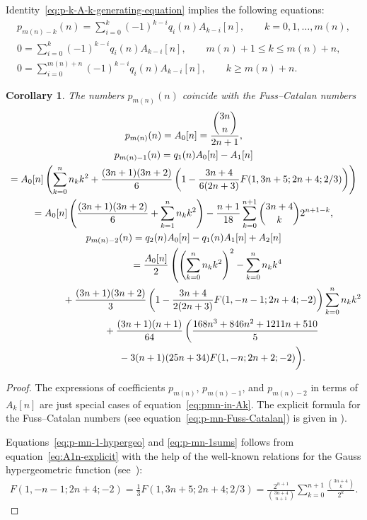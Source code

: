 \documentclass[pdftex]{sigma}
\numberwithin{equation}{section}
\newtheorem{Corollary}[Theorem]{Corollary}
\begin{document}
Identity~\eqref{eq:p-k-A-k-generating-equation} implies the following equations:
\begin{gather}
p_{m(n)-k}(n) =\sum\limits_{i=0}^k(-1)^{k-i}q_i(n)A_{k-i}[n],\qquad k=0,1,\ldots,m(n),\label{eq:pmn-in-Ak}\\
0 =\sum\limits_{i=0}^k(-1)^{k-i}q_i(n)A_{k-i}[n],\qquad m(n)+1\leq k\leq m(n)+n,\nonumber\\
0 =\sum\limits_{i=0}^{m(n)+n}(-1)^{k-i}q_i(n)A_{k-i}[n],\qquad k\geq m(n)+n.\nonumber
\end{gather}
\begin{Corollary}
The numbers $p_{m(n)}(n)$ coincide with the Fuss--Catalan numbers
\begin{gather}
 p_{m(n)}(n)=A_0[n]=\frac{\dbinom{3n}{n}}{2n+1},\label{eq:p-mn-Fuss-Catalan}\\
 p_{m(n)-1}(n)=q_1(n)A_0[n]-A_1[n]\label{eq:pmn-1-via-Ak}\\
 =A_0[n] \left(\sum\limits_{k=0}^n n_kk^2
+\frac{(3n+1)(3n+2)}{6} \left(1-\frac{3n+4}{6(2n+3)}F(1,3n+5;2n+4;2/3)\right) \right)\label{eq:p-mn-1-hypergeo}\\
 =A_0[n]\left(\frac{(3n+1)(3n+2)}{6}+\sum\limits_{k=1}^{n}n_kk^2\right)
-\frac{n+1}{18}\sum\limits_{k=0}^{n+1}\binom{3n+4}{k}2^{n+1-k},\label{eq:p-mn-1sums}
\\
\label{eq:pmn-2-via-Ak}
p_{m(n)-2}(n) =q_2(n)A_0[n]-q_1(n)A_1[n]+A_2[n]\\
\hphantom{p_{m(n)-2}(n)}{} =\frac{A_0[n]}{2}\left(\left(\sum\limits_{k=0}^n n_kk^2\right)^2-\sum\limits_{k=0}^n n_kk^4\right.\nonumber\\
 \hphantom{p_{m(n)-2}(n)=}{}+\frac{(3n+1)(3n+2)}{3}
\left(1-\frac{3n+4}{2(2n+3)}F(1,-n-1;2n+4;-2)\right)\sum\limits_{k=0}^n n_kk^2\nonumber\\
 \hphantom{p_{m(n)-2}(n)=}{} +\frac{(3n+1)(n+1)}{64}\left(\frac{168n^3+846n^2+1211n+510}5\right.\nonumber\\
 \hphantom{p_{m(n)-2}(n)=}{} -3(n+1)(25n+34)F(1,-n;2n+2;-2)\bigg).\label{eq:p-mn-2-hypergeo}
\end{gather}
\end{Corollary}
\begin{proof}
The expressions of coefficients $p_{m(n)}$, $p_{m(n)-1}$, and $p_{m(n)-2}$ in terms of $A_k[n]$ are just special cases of
equation~\eqref{eq:pmn-in-Ak}. The explicit formula for the Fuss--Catalan numbers (see equation~\eqref{eq:p-mn-Fuss-Catalan})
is given in \cite[sequence~$A001764$]{OEIS}).

Equations~\eqref{eq:p-mn-1-hypergeo} and \eqref{eq:p-mn-1sums} follows from equation~\eqref{eq:A1n-explicit} with the help
of the well-known relations for the Gauss hypergeometric function (see~\cite{BE}):
\begin{gather*}
F(1,-n-1;2n+4;-2)=\frac13F(1,3n+5;2n+4;2/3)=\frac{2^{n+1}}{\binom{3n+4}{n+1}}\sum\limits_{k=0}^{n+1}\frac{\binom{3n+4}{k}}{2^k}.\tag*{\qed}
\end{gather*}\renewcommand{\qed}{}
\end{proof}
\end{document}

